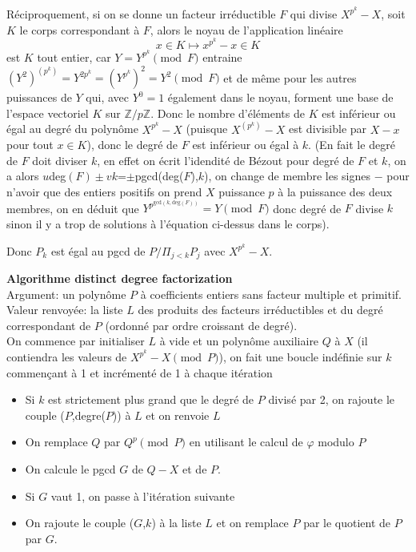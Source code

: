 \documentclass[a4paper,11pt]{article}
\newcommand{\Z}{{\mathbb{Z}}}
\begin{document}
Réciproquement, si on se donne un facteur irréductible $F$ qui divise
$X^{p^k}-X$, soit $K$ le corps correspondant à $F$, 
alors le noyau de l'application linéaire
\[ x \in K \mapsto x^{p^k}-x \in K \]
est $K$ tout entier, car $Y=Y^{p^k} \pmod F$
entraine $(Y^2)^{(p^k)}=Y^{2 p^k}=(Y^{p^k})^2=Y^2 \pmod F$ et de même
pour les autres puissances de $Y$ qui, avec $Y^0=1$ également dans le
noyau, forment une base de l'espace vectoriel $K$ sur $\Z/p\Z$. Donc le
nombre d'éléments de $K$ est inférieur ou égal au degré du polynôme
$X^{p^k}-X$ (puisque $X^{(p^k)}-X$ est divisible par
$X-x$ pour tout $x\in K$),
donc le degré de $F$ est inférieur ou égal à $k$.
(En fait le degré de $F$ doit diviser $k$, en effet
on écrit l'idendité de Bézout
pour degré de $F$ et $k$, on a alors
$u$deg$(F)\pm vk$=$\pm$pgcd(deg($F$),$k$),
on change de membre les signes $-$ pour n'avoir que des entiers positifs
on prend $X$ puissance $p$ à la puissance des deux membres, on en
déduit que $Y^{p^{\mbox{gcd}(k,\mbox{deg}(F))}}=Y \pmod F $ donc
degré de $F$ divise $k$ sinon il y a trop de solutions à l'équation
ci-dessus dans le corps).

Donc $P_k$ est égal au pgcd de $P/\Pi_{j<k} P_j$ avec $X^{p^k}-X$.

{\bf Algorithme distinct degree factorization}\\
Argument: un polynôme $P$ à coefficients entiers 
sans facteur multiple et primitif.\\
Valeur renvoyée: la liste $L$ des produits des facteurs irréductibles et du
degré correspondant de $P$ (ordonné par ordre croissant de degré).\\
On commence par initialiser $L$ à vide et un polynôme auxiliaire $Q$ à $X$
(il contiendra les valeurs de $X^{p^k}-X \pmod P$), on fait une boucle
indéfinie sur $k$ commençant à 1 et incrémenté de 1 à chaque itération
\begin{itemize}
\item Si $k$ est strictement plus grand que le degré de $P$ divisé par 2,
on rajoute le couple ($P$,degre($P$)) à $L$ et on renvoie $L$
\item On remplace $Q$ par $Q^p \pmod P$ en utilisant le calcul de $\varphi$
modulo $P$
\item On calcule le pgcd $G$ de $Q-X$ et de $P$. 
\item Si $G$ vaut 1, on passe à l'itération suivante
\item On rajoute le couple ($G$,$k$) à la liste $L$ et on remplace $P$
par le quotient de $P$ par $G$.
\end{itemize}
\end{document}
